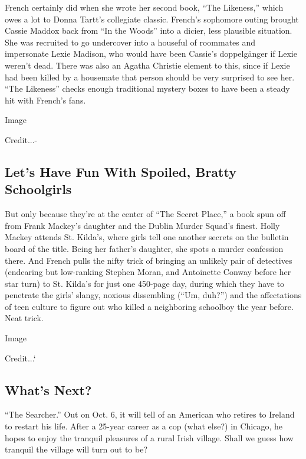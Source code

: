French certainly did when she wrote her second book, ``The Likeness,''
which owes a lot to Donna Tartt's collegiate classic. French's sophomore
outing brought Cassie Maddox back from ``In the Woods'' into a dicier,
less plausible situation. She was recruited to go undercover into a
houseful of roommates and impersonate Lexie Madison, who would have been
Cassie's doppelgänger if Lexie weren't dead. There was also an Agatha
Christie element to this, since if Lexie had been killed by a housemate
that person should be very surprised to see her. ``The Likeness'' checks
enough traditional mystery boxes to have been a steady hit with French's
fans.

Image

Credit...-

\hypertarget{lets-have-fun-with-spoiled-bratty-schoolgirls}{%
\subsection{Let's Have Fun With Spoiled, Bratty
Schoolgirls}\label{lets-have-fun-with-spoiled-bratty-schoolgirls}}

But only because they're at the center of ``The Secret Place,'' a book
spun off from Frank Mackey's daughter and the Dublin Murder Squad's
finest. Holly Mackey attends St. Kilda's, where girls tell one another
secrets on the bulletin board of the title. Being her father's daughter,
she spots a murder confession there. And French pulls the nifty trick of
bringing an unlikely pair of detectives (endearing but low-ranking
Stephen Moran, and Antoinette Conway before her star turn) to St.
Kilda's for just one 450-page day, during which they have to penetrate
the girls' slangy, noxious dissembling (``Um, duh?'') and the
affectations of teen culture to figure out who killed a neighboring
schoolboy the year before. Neat trick.

Image

Credit...`

\hypertarget{whats-next}{%
\subsection{What's Next?}\label{whats-next}}

``The Searcher.'' Out on Oct. 6, it will tell of an American who retires
to Ireland to restart his life. After a 25-year career as a cop (what
else?) in Chicago, he hopes to enjoy the tranquil pleasures of a rural
Irish village. Shall we guess how tranquil the village will turn out to
be?

